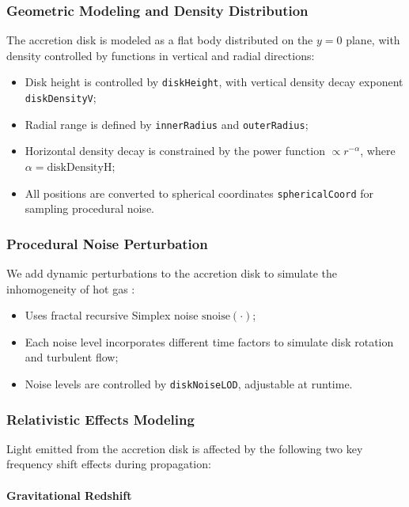 \documentclass[11pt,a4paper]{article}
\begin{document}
\subsubsection{Geometric Modeling and Density Distribution}

The accretion disk is modeled as a flat body distributed on the $y=0$ plane, with density controlled by functions in vertical and radial directions:

\begin{itemize}
    \item Disk height is controlled by \texttt{diskHeight}, with vertical density decay exponent \texttt{diskDensityV};
    \item Radial range is defined by \texttt{innerRadius} and \texttt{outerRadius};
    \item Horizontal density decay is constrained by the power function $\propto r^{-\alpha}$, where $\alpha = \text{diskDensityH}$;
    \item All positions are converted to spherical coordinates \texttt{sphericalCoord} for sampling procedural noise.
\end{itemize}

\subsubsection{Procedural Noise Perturbation}

We add dynamic perturbations to the accretion disk to simulate the inhomogeneity of hot gas :

\begin{itemize}
    \item Uses fractal recursive Simplex noise $\text{snoise}(\cdot)$;
    \item Each noise level incorporates different time factors to simulate disk rotation and turbulent flow;
    \item Noise levels are controlled by \texttt{diskNoiseLOD}, adjustable at runtime.
\end{itemize}

\subsubsection{Relativistic Effects Modeling}

Light emitted from the accretion disk is affected by the following two key frequency shift effects during propagation:

\paragraph{Gravitational Redshift}
\end{document}
